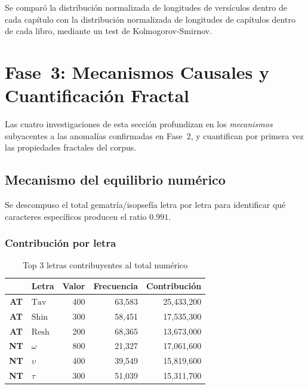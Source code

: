 \documentclass[12pt,a4paper]{article}
\newcommand{\ot}{\textcolor{otcolor}{\textbf{AT}}}
\newcommand{\nt}{\textcolor{ntcolor}{\textbf{NT}}}
\newcommand{\tav}{\mathrm{Tav}}
\newcommand{\shin}{\mathrm{Shin}}
\newcommand{\resh}{\mathrm{Resh}}
\begin{document}
Se compar\'o la distribuci\'on normalizada de longitudes de vers\'iculos dentro de cada
cap\'itulo con la distribuci\'on normalizada de longitudes de cap\'itulos dentro de cada libro,
mediante un test de Kolmogorov-Smirnov.

\begin{center}
\end{center}


\section{Fase~3: Mecanismos Causales y Cuantificaci\'on Fractal}

Las cuatro investigaciones de esta secci\'on profundizan en los \emph{mecanismos}
subyacentes a las anomal\'ias confirmadas en Fase~2, y cuantifican por primera vez
las propiedades fractales del corpus.

\subsection{Mecanismo del equilibrio num\'erico}

Se descompuso el total gematr\'ia/isopsef\'ia letra por letra para identificar
qu\'e caracteres espec\'ificos producen el ratio $0.991$.

\subsubsection{Contribuci\'on por letra}

\begin{table}[H]
\centering
\caption{Top 3 letras contribuyentes al total num\'erico}
\label{tab:lettercontrib}
\begin{tabular}{clrrr}
\toprule
& \textbf{Letra} & \textbf{Valor} & \textbf{Frecuencia} & \textbf{Contribuci\'on} \\
\midrule
\ot{} & $\tav$     & 400 & 63,583 & 25,433,200 \\
\ot{} & $\shin$    & 300 & 58,451 & 17,535,300 \\
\ot{} & $\resh$    & 200 & 68,365 & 13,673,000 \\
\midrule
\nt{} & $\omega$   & 800 & 21,327 & 17,061,600 \\
\nt{} & $\upsilon$ & 400 & 39,549 & 15,819,600 \\
\nt{} & $\tau$     & 300 & 51,039 & 15,311,700 \\
\bottomrule
\end{tabular}
\end{table}
\end{document}
